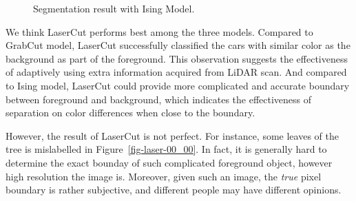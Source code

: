 \documentclass{article} %
\begin{document}
\begin{figure}[h]
\begin{center}
\end{center}
\caption{Segmentation result with Ising Model.}
\label{fig-ising-00_00}
\end{figure}


We think LaserCut performs best among the three models.
Compared to GrabCut model, LaserCut successfully classified the cars
with similar color as the background as part of the foreground. This
observation suggests the effectiveness of adaptively using extra
information acquired from LiDAR scan. And compared to
Ising model, LaserCut could provide more complicated and accurate
boundary between foreground and background, which indicates the
effectiveness of separation on color differences when close to the
boundary.

However, the result of LaserCut is not perfect.
For instance, some leaves of the tree is mislabelled in
Figure~\ref{fig-laser-00_00}. In fact, it is generally hard to
determine the exact bounday of such complicated foreground
object, however high resolution the image is. Moreover, given such an
image, the \emph{true} pixel boundary is rather subjective, and
different people may have different opinions.
\end{document}
